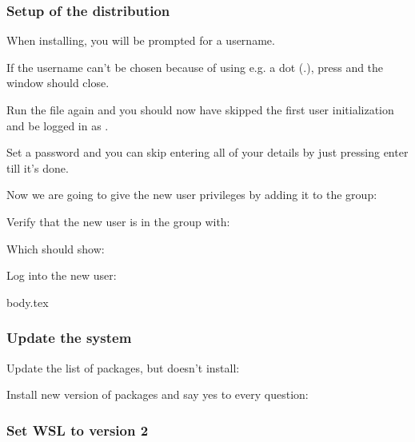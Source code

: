 \subsubsection{Setup of the distribution}

When installing, you will be prompted for a username.


If the username can't be chosen because of using e.g. a dot (.), press  and the window should close.

Run the  file again and you should now have skipped the first user initialization and be logged in as .


Set a password and you can skip entering all of your details by just pressing enter till it's done.

Now we are going to give the new user  privileges by adding it to the  group:


Verify that the new user is in the  group with: 

Which should show: 

Log into the new user:


{body.tex}


\subsubsection{Update the system}

Update the list of packages, but doesn't install:


Install new version of packages and say yes to every question:



\subsubsection{Set WSL to version 2}

